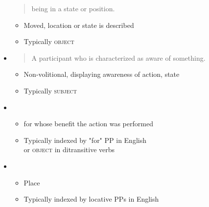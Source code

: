 \documentclass[headrule,footrule]{foils}
\begin{document}
\begin{itemize}
\begin{quote}
being in a state or position. 
  \end{quote}
  \begin{itemize}
  \item  Moved, location or state is described
  \item Typically \textsc{object}
\end{itemize}
\begin{exe}
  \ex {}
  \ex {}
  \ex {}
  \ex {}
  \ex *
\end{exe}
\newpage

\item  {}
  \begin{quote}
    A participant who is characterized as aware of something.
  \end{quote}
  \begin{itemize}
  \item   Non-volitional, displaying awareness of action, state
  \item Typically \textsc{subject}
  \end{itemize}
  \begin{exe}
  \ex{}
  \ex{}
  \ex{}
\end{exe}
\newpage
\item  {}
  \begin{itemize}
  \item   for whose benefit the action was performed
  \item   Typically indexed by "for" PP in English
    \\ or \textsc{object} in ditransitive verbs
  \end{itemize}
  \begin{exe}
  \ex{}
  \ex{}
\end{exe}

\item  {}
  \begin{itemize}
  \item  Place
  \item Typically indexed by locative PPs in English
  \end{itemize}
  \begin{exe}
  \ex{}
  \ex{}
\end{exe}
\newpage  


\end{itemize}
\end{document}
